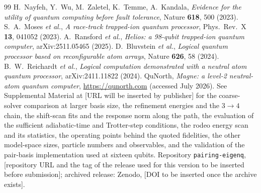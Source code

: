 \documentclass[
  aps,            %
  prc,            %
  reprint,        %
  superscriptaddress,
  floatfix,
  nofootinbib
]{revtex4-2}
\begin{document}
\begin{thebibliography}{99}
H.~Nayfeh, Y.~Wu, M.~Zaletel, K.~Temme, A.~Kandala,
\textit{Evidence for the utility of quantum computing before fault tolerance},
Nature \textbf{618}, 500 (2023).
S.~A.~Moses \textit{et al.},
\textit{A race-track trapped-ion quantum processor},
Phys.\ Rev.\ X \textbf{13}, 041052 (2023).
A.~Ransford \textit{et al.},
\textit{Helios: a 98-qubit trapped-ion quantum computer},
arXiv:2511.05465 (2025).
D.~Bluvstein \textit{et al.},
\textit{Logical quantum processor based on reconfigurable atom arrays},
Nature \textbf{626}, 58 (2024).
B.~W.~Reichardt \textit{et al.},
\textit{Logical computation demonstrated with a neutral atom quantum processor},
arXiv:2411.11822 (2024).
QuNorth, \textit{Magne: a level-2 neutral-atom quantum computer},
\url{https://qunorth.com} (accessed July 2026).
 See Supplemental Material at [URL will be inserted by
publisher] for the coarse-solver comparison at larger basis size, the
refinement energies and the $3\to4$ chain, the shift-scan fits and the
response norm along the path, the evaluation of the sufficient
adiabatic-time and Trotter-step conditions, the rodeo energy scan and its
statistics, the operating points behind the quoted fidelities, the other
model-space sizes, particle numbers and observables, and the validation of
the pair-basis implementation used at sixteen qubits.
 Repository \texttt{pairing-eigenq}, [repository URL and the
tag of the release used for this version to be inserted before submission];
archived release: Zenodo, [DOI to be inserted once the archive exists].
\end{thebibliography}
\end{document}
